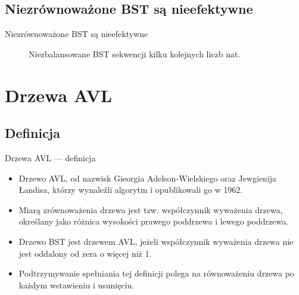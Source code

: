 \documentclass{beamer}
\begin{document}
\subsection{Niezrównoważone BST są nieefektywne}

\begin{frame}{Niezrównoważone BST są nieefektywne}
\begin{figure}
\caption{\label{fig:sequenceunbalancedbst}
Niezbalansowane BST sekwencji kilku kolejnych liczb nat.}
\end{figure}
\end{frame}

\section{Drzewa AVL}

\subsection{Definicja}

\begin{frame}{Drzewa AVL --- definicja}
\begin{itemize}
\item Drzewo AVL, od nazwisk Gieorgia Adelson-Wielskiego oraz Jewgienija Łandisa, którzy wynaleźli algorytm i opublikowali go w 1962.

\item Miarą zrównoważenia drzewa jest tzw. współczynnik wyważenia drzewa, określany jako różnica wysokości prawego poddrzewa i lewego poddrzewa.

\item Drzewo BST jest drzewem AVL, jeżeli współczynnik wyważenia drzewa nie jest oddalony od zera o więcej niż 1.

\item Podtrzymywanie spełniania tej definicji polega na równoważeniu drzewa po każdym wstawieniu i usunięciu.
\end{itemize}
\end{frame}
\end{document}

